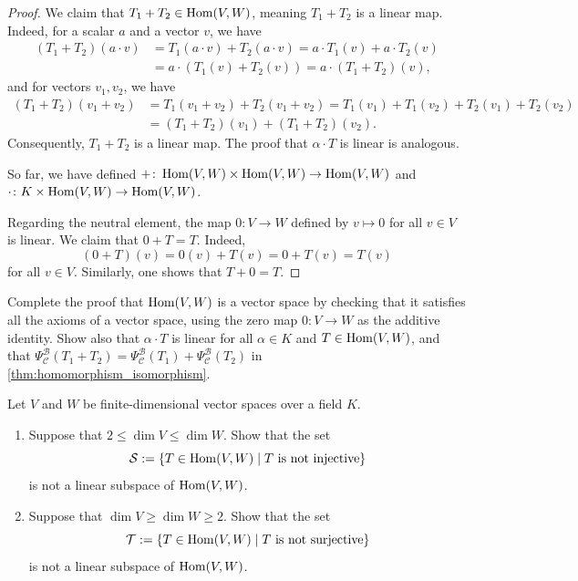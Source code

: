 \begin{proof}
  We claim that $T_1 + T_2 \in \operatorname{Hom}(V,W)$, meaning $T_1 + T_2$ is a linear map. Indeed, for a scalar $a$ and a vector $v$, we have
  \begin{align*}
    (T_1 + T_2)(a \cdot v) &= T_1(a \cdot v) + T_2(a \cdot v) = a \cdot T_1(v) + a \cdot T_2(v) \\
    &= a \cdot (T_1(v) + T_2(v)) = a \cdot (T_1 + T_2)(v),
  \end{align*}
  and for vectors $v_1, v_2$, we have
  \begin{align*}
    (T_1 + T_2)(v_1 + v_2) &= T_1(v_1 + v_2) + T_2(v_1 + v_2) = T_1(v_1) + T_1(v_2) + T_2(v_1) + T_2(v_2) \\
    &= (T_1 + T_2)(v_1) + (T_1 + T_2)(v_2).
  \end{align*}
  Consequently, $T_1 + T_2$ is a linear map. The proof that $\alpha \cdot T$ is linear is analogous.

  So far, we have defined $+ \colon \operatorname{Hom}(V,W) \times \operatorname{Hom}(V,W) \to \operatorname{Hom}(V,W)$ and $\cdot \colon K \times \operatorname{Hom}(V,W) \to \operatorname{Hom}(V,W)$.

  Regarding the neutral element, the map $0 \colon V \to W$ defined by $v \mapsto 0$ for all $v \in V$ is linear. We claim that $0 + T = T$. Indeed,
  \[ (0 + T)(v) = 0(v) + T(v) = 0 + T(v) = T(v) \]
  for all $v \in V$. Similarly, one shows that $T + 0 = T$.
\end{proof}

\begin{exercise}
  \label{exc:hom_axioms}
  Complete the proof that $\operatorname{Hom}(V,W)$ is a vector space by checking that it satisfies all the axioms of a vector space, using the zero map $0 \colon V \to W$ as the additive identity. Show also that $\alpha \cdot T$ is linear for all $\alpha \in K$ and $T \in \operatorname{Hom}(V,W)$, and that $\Psi_{\mathcal{C}}^{\mathcal{B}}(T_1 + T_2) = \Psi_{\mathcal{C}}^{\mathcal{B}}(T_1) + \Psi_{\mathcal{C}}^{\mathcal{B}}(T_2)$ in \cref{thm:homomorphism_isomorphism}.
\end{exercise}

\begin{exercise}
\label{exc:hom_non_injective_non_surjective_not_subspaces}
Let $V$ and $W$ be finite-dimensional vector spaces over a field $K$.
\begin{enumerate}
    \item Suppose that $2 \le \dim V \le \dim W$. Show that the set
    \[
    \mathcal{S} := \{T \in \operatorname{Hom}(V, W) \mid T \text{ is not injective}\}
    \]
    is not a linear subspace of $\operatorname{Hom}(V, W)$.
    \item Suppose that $\dim V \ge \dim W \ge 2$. Show that the set
    \[
    \mathcal{T} := \{T \in \operatorname{Hom}(V, W) \mid T \text{ is not surjective}\}
    \]
    is not a linear subspace of $\operatorname{Hom}(V, W)$.
\end{enumerate}
\end{exercise}

